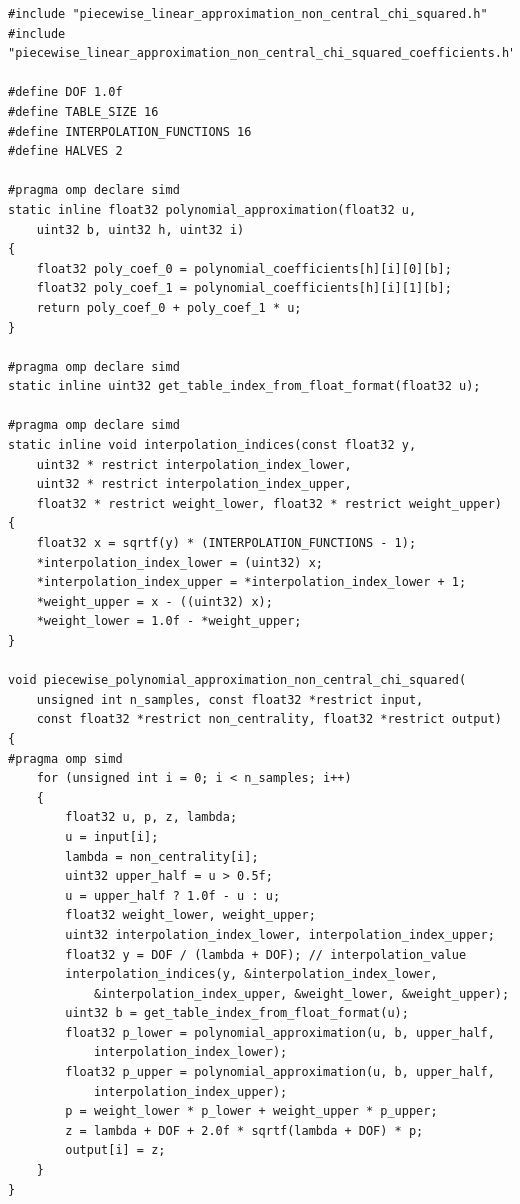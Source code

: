 \documentclass[11pt,a4paper,twoside,english]{extarticle}
\begin{document}
\begin{lstfloat}[h!tb]
\begin{lstlisting}[style=C, captionpos=b, caption={Piecewise linear approximation for the non-central $ chi^2 $-distribution.}, label={code:c:piecewise_linear_approximation_non_central_chi_squared}]
#include "piecewise_linear_approximation_non_central_chi_squared.h"
#include "piecewise_linear_approximation_non_central_chi_squared_coefficients.h"

#define DOF 1.0f
#define TABLE_SIZE 16
#define INTERPOLATION_FUNCTIONS 16
#define HALVES 2

#pragma omp declare simd
static inline float32 polynomial_approximation(float32 u, 
    uint32 b, uint32 h, uint32 i) 
{ 
    float32 poly_coef_0 = polynomial_coefficients[h][i][0][b];
    float32 poly_coef_1 = polynomial_coefficients[h][i][1][b];
    return poly_coef_0 + poly_coef_1 * u;
}

#pragma omp declare simd
static inline uint32 get_table_index_from_float_format(float32 u);

#pragma omp declare simd
static inline void interpolation_indices(const float32 y, 
    uint32 * restrict interpolation_index_lower, 
    uint32 * restrict interpolation_index_upper, 
    float32 * restrict weight_lower, float32 * restrict weight_upper)
{
    float32 x = sqrtf(y) * (INTERPOLATION_FUNCTIONS - 1);
    *interpolation_index_lower = (uint32) x;
    *interpolation_index_upper = *interpolation_index_lower + 1;
    *weight_upper = x - ((uint32) x);
    *weight_lower = 1.0f - *weight_upper;
}

void piecewise_polynomial_approximation_non_central_chi_squared(
    unsigned int n_samples, const float32 *restrict input, 
    const float32 *restrict non_centrality, float32 *restrict output)
{
#pragma omp simd
    for (unsigned int i = 0; i < n_samples; i++)
    {
        float32 u, p, z, lambda;
        u = input[i];
        lambda = non_centrality[i];
        uint32 upper_half = u > 0.5f;
        u = upper_half ? 1.0f - u : u;
        float32 weight_lower, weight_upper;
        uint32 interpolation_index_lower, interpolation_index_upper;
        float32 y = DOF / (lambda + DOF); // interpolation_value
        interpolation_indices(y, &interpolation_index_lower,
            &interpolation_index_upper, &weight_lower, &weight_upper);
        uint32 b = get_table_index_from_float_format(u);
        float32 p_lower = polynomial_approximation(u, b, upper_half, 
            interpolation_index_lower);
        float32 p_upper = polynomial_approximation(u, b, upper_half, 
            interpolation_index_upper);
        p = weight_lower * p_lower + weight_upper * p_upper;
        z = lambda + DOF + 2.0f * sqrtf(lambda + DOF) * p;
        output[i] = z;
    }
}
\end{lstlisting}
\end{lstfloat}
\end{document}
